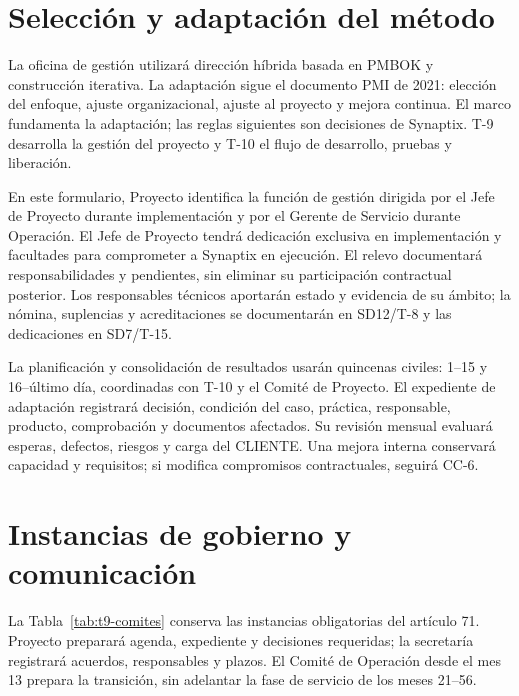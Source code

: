 \section{Selección y adaptación del método}

La oficina de gestión utilizará dirección híbrida basada en PMBOK y construcción iterativa. La adaptación sigue el documento PMI de 2021: elección del enfoque, ajuste organizacional, ajuste al proyecto y mejora continua. El marco fundamenta la adaptación; las reglas siguientes son decisiones de Synaptix. T-9 desarrolla la gestión del proyecto y T-10 el flujo de desarrollo, pruebas y liberación. \parencite[pp.~1--7]{sd6-pmi-adaptacion}

En este formulario, Proyecto identifica la función de gestión dirigida por el Jefe de Proyecto durante implementación y por el Gerente de Servicio durante Operación. El Jefe de Proyecto tendrá dedicación exclusiva en implementación y facultades para comprometer a Synaptix en ejecución. El relevo documentará responsabilidades y pendientes, sin eliminar su participación contractual posterior. Los responsables técnicos aportarán estado y evidencia de su ámbito; la nómina, suplencias y acreditaciones se documentarán en SD12/T-8 y las dedicaciones en SD7/T-15. \parencite[cap.~19, pp.~33--34]{sd6-bt}

La planificación y consolidación de resultados usarán quincenas civiles: 1--15 y 16--último día, coordinadas con T-10 y el Comité de Proyecto. El expediente de adaptación registrará decisión, condición del caso, práctica, responsable, producto, comprobación y documentos afectados. Su revisión mensual evaluará esperas, defectos, riesgos y carga del CLIENTE. Una mejora interna conservará capacidad y requisitos; si modifica compromisos contractuales, seguirá CC-6.


\section{Instancias de gobierno y comunicación}

La Tabla~\ref{tab:t9-comites} conserva las instancias obligatorias del artículo 71. Proyecto preparará agenda, expediente y decisiones requeridas; la secretaría registrará acuerdos, responsables y plazos. El Comité de Operación desde el mes 13 prepara la transición, sin adelantar la fase de servicio de los meses 21--56. \parencites[art.~71, pp.~37--38]{sd6-ba}[RT-19.09, p.~34]{sd6-bt}

